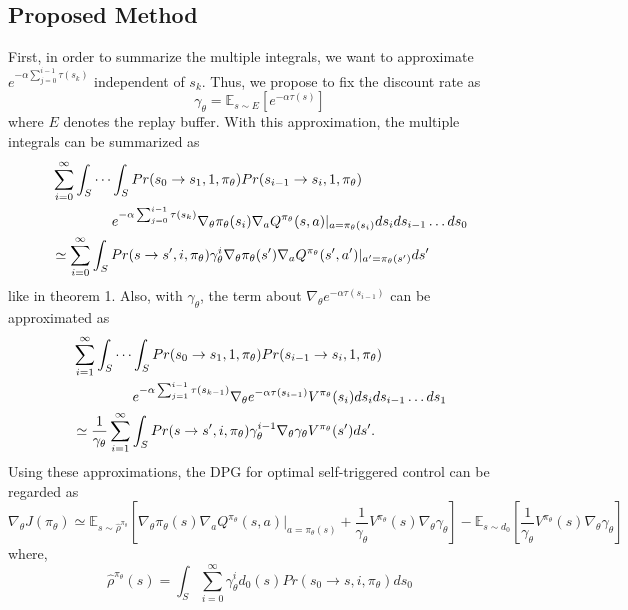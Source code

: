\documentclass[english, dvipdfmx]{ampmt}             %
\newcommand{\expect}{\mathbb{E}}
\begin{document}
\subsection{Proposed Method}
First, in order to summarize the multiple integrals, we want to approximate $e^{-\alpha\sum_{j=0}^{i-1}\tau(s_k)}$ independent of $s_k$.
Thus, we propose to fix the discount rate as
\begin{equation}
	\gamma_{\theta} = \expect_{s\sim E}[e^{-\alpha\tau(s)}]
\end{equation}
where $E$ denotes the replay buffer. With this approximation, the multiple integrals can be summarized as
\begin{align}
	&\sum_{i=0}^{\infty}\int_{S}\cdots\int_{S}Pr(s_0\to s_1,1,\pi_{\theta})Pr(s_{i-1}\to s_i,1,\pi_{\theta})\nonumber\\
	&\hspace{10ex}e^{-\alpha\sum_{j=0}^{i-1}\tau(s_k)}\nabla_{\theta}\pi_{\theta}(s_i)\nabla_aQ^{\pi_{\theta}}(s,a)|_{a=\pi_{\theta}(s_i)}ds_ids_{i-1}\ldots ds_0\nonumber\\
	&\simeq \sum_{i=0}^{\infty}\int_{S}Pr(s\to s^{\prime},i,\pi_{\theta})\gamma_{\theta}^i\nabla_{\theta}\pi_{\theta}(s^{\prime})\nabla_aQ^{\pi_{\theta}}(s^{\prime},a^{\prime})|_{a^{\prime}=\pi_{\theta}(s^{\prime})}ds^{\prime}
\end{align}
like in theorem 1. Also, with $\gamma_{\theta}$, the term about $\nabla_{\theta}e^{-\alpha\tau(s_{i-1})}$ can be approximated as
\begin{align}
	&\sum_{i=1}^{\infty}\int_{S}\cdots\int_{S}Pr(s_0\to s_1,1,\pi_{\theta})Pr(s_{i-1}\to s_i,1,\pi_{\theta})\nonumber\\
	&\hspace{10ex}e^{-\alpha\sum_{j=1}^{i-1}\tau(s_{k-1})}\nabla_{\theta}e^{-\alpha\tau(s_{i-1})}V^{\pi_{\theta}}(s_i)ds_ids_{i-1}\ldots ds_1\nonumber\\
	&\simeq \frac{1}{\gamma_{\theta}}\sum_{i=1}^{\infty}\int_{S}Pr(s\to s^{\prime},i,\pi_{\theta})\gamma_{\theta}^{i-1}\nabla_{\theta}\gamma_{\theta}V^{\pi_{\theta}}(s^{\prime})ds^{\prime}.
\end{align}
Using these approximations, the DPG for optimal self-triggered control can be regarded as
\begin{equation}
	\nabla_{\theta}J(\pi_{\theta}) \simeq \expect_{s\sim\hat{\rho}^{\pi_{\theta}}}[
	\nabla_{\theta}\pi_{\theta}(s)\nabla_{a}Q^{\pi_{\theta}}(s, a)|_{a=\pi_{\theta}(s)}+\frac{1}{\gamma_{\theta}}V^{\pi_{\theta}}(s)\nabla_{\theta}\gamma_{\theta}] - \expect_{s\sim d_0}[\frac{1}{\gamma_{\theta}}V^{\pi_{\theta}}(s)\nabla_{\theta}\gamma_{\theta}]
\end{equation}
where, 
\begin{equation}
	\hat{\rho}^{\pi_{\theta}}(s) = \int_{S}\sum_{i=0}^{\infty}\gamma_{\theta}^id_0(s)Pr(s_0\to s, i, \pi_{\theta})ds_0
\end{equation}
\end{document}
